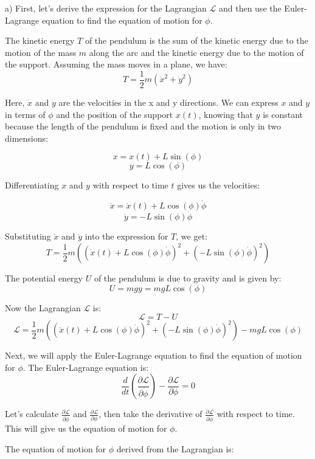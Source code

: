 \documentclass[a4paper,11pt]{article}
\begin{document}
a) First, let's derive the expression for the Lagrangian \( \mathcal{L} \) and then use the Euler-Lagrange equation to find the equation of motion for \( \phi \).

The kinetic energy \( T \) of the pendulum is the sum of the kinetic energy due to the motion of the mass \( m \) along the arc and the kinetic energy due to the motion of the support. Assuming the mass moves in a plane, we have:
\[ T = \frac{1}{2} m (\dot{x}^2 + \dot{y}^2) \]

Here, \( \dot{x} \) and \( \dot{y} \) are the velocities in the x and y directions. We can express \( x \) and \( y \) in terms of \( \phi \) and the position of the support \( x(t) \), knowing that \( y \) is constant because the length of the pendulum is fixed and the motion is only in two dimensions:

\[ x = x(t) + L \sin(\phi) \]
\[ y = L \cos(\phi) \]

Differentiating \( x \) and \( y \) with respect to time \( t \) gives us the velocities:

\[ \dot{x} = \dot{x}(t) + L \cos(\phi) \dot{\phi} \]
\[ \dot{y} = -L \sin(\phi) \dot{\phi} \]

Substituting \( \dot{x} \) and \( \dot{y} \) into the expression for \( T \), we get:
\[ T = \frac{1}{2} m \left( (\dot{x}(t) + L \cos(\phi) \dot{\phi})^2 + (-L \sin(\phi) \dot{\phi})^2 \right) \]

The potential energy \( U \) of the pendulum is due to gravity and is given by:
\[ U = mgy = mgL \cos(\phi) \]

Now the Lagrangian \( \mathcal{L} \) is:
\[ \mathcal{L} = T - U \]
\[ \mathcal{L} = \frac{1}{2} m \left( (\dot{x}(t) + L \cos(\phi) \dot{\phi})^2 + (-L \sin(\phi) \dot{\phi})^2 \right) - mgL \cos(\phi) \]

Next, we will apply the Euler-Lagrange equation to find the equation of motion for \( \phi \). The Euler-Lagrange equation is:
\[ \frac{d}{dt} \left( \frac{\partial \mathcal{L}}{\partial \dot{\phi}} \right) - \frac{\partial \mathcal{L}}{\partial \phi} = 0 \]

Let's calculate \( \frac{\partial \mathcal{L}}{\partial \dot{\phi}} \) and \( \frac{\partial \mathcal{L}}{\partial \phi} \), then take the derivative of \( \frac{\partial \mathcal{L}}{\partial \dot{\phi}} \) with respect to time. This will give us the equation of motion for \( \phi \).

The equation of motion for \( \phi \) derived from the Lagrangian is:
\end{document}
